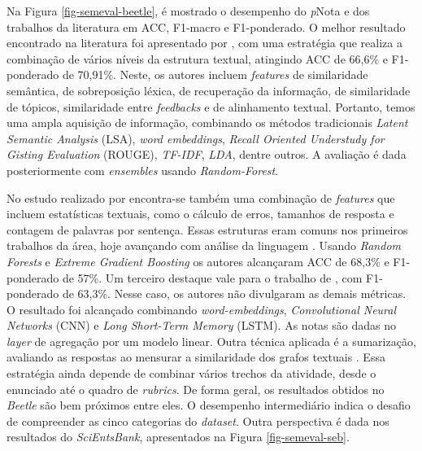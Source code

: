 Na Figura \ref{fig-semeval-beetle}, é mostrado o desempenho do \textit{p}Nota e dos trabalhos da literatura em ACC, F1-macro e F1-ponderado. O melhor resultado encontrado na literatura foi apresentado por \cite{sahu2020}, com uma estratégia que realiza a combinação de vários níveis da estrutura textual, atingindo ACC de 66,6\% e F1-ponderado de 70,91\%. Neste, os autores incluem \textit{features} de similaridade semântica, de sobreposição léxica, de recuperação da informação, de similaridade de tópicos, similaridade entre \textit{feedbacks} e de alinhamento textual. Portanto, temos uma ampla aquisição de informação, combinando os métodos tradicionais \textit{Latent Semantic Analysis} (LSA), \textit{word embeddings}, \textit{Recall Oriented Understudy for Gisting Evaluation} (ROUGE), \textit{TF-IDF}, \textit{LDA}, dentre outros. A avaliação é dada posteriormente com \textit{ensembles} usando \textit{Random-Forest}.

No estudo realizado por \cite{galhardi2018c} encontra-se também uma combinação de \textit{features} que incluem estatísticas textuais, como o cálculo de erros, tamanhos de resposta e contagem de palavras por sentença. Essas estruturas eram comuns nos primeiros trabalhos da área, hoje avançando com análise da linguagem \cite{burrows2015}. Usando \textit{Random Forests} e \textit{Extreme Gradient Boosting} os autores alcançaram ACC de 68,3\% e F1-ponderado de 57\%. Um terceiro destaque vale para o trabalho de \cite{riordan2017}, com F1-ponderado de 63,3\%. Nesse caso, os autores não divulgaram as demais métricas. O resultado foi alcançado combinando \textit{word-embeddings}, \textit{Convolutional Neural Networks} (CNN) e \textit{Long Short-Term Memory} (LSTM). As notas são dadas no \textit{layer} de agregação por um modelo linear. Outra técnica aplicada é a sumarização, avaliando as respostas ao mensurar a similaridade dos grafos textuais \cite{ramachandran2015a, ramachandran2015b}. Essa estratégia ainda depende de combinar vários trechos da atividade, desde o enunciado até o quadro de \textit{rubrics}. De forma geral, os resultados obtidos no \textit{Beetle} são bem próximos entre eles. O desempenho intermediário indica o desafio de compreender as cinco categorias do \textit{dataset}. Outra perspectiva é dada nos resultados do \textit{SciEntsBank}, apresentados na Figura \ref{fig-semeval-seb}.

